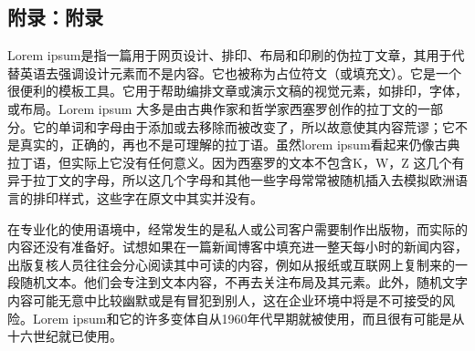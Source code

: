 \documentclass[a4paper,twoside]{article}
\begin{document}
\begin{spacing}{1.2}
\addtocounter{page}{-1}
\thispagestyle{empty}


\newpage
\appendix
\section*{附录：附录}
Lorem ipsum是指一篇用于网页设计、排印、布局和印刷的伪拉丁文章，其用于代替英语去强调设计元素而不是内容。它也被称为占位符文（或填充文）。它是一个很便利的模板工具。它用于帮助编排文章或演示文稿的视觉元素，如排印，字体，或布局。Lorem ipsum 大多是由古典作家和哲学家西塞罗创作的拉丁文的一部分。它的单词和字母由于添加或去移除而被改变了，所以故意使其内容荒谬；它不是真实的，正确的，再也不是可理解的拉丁语。虽然lorem ipsum看起来仍像古典拉丁语，但实际上它没有任何意义。因为西塞罗的文本不包含K，W，Z 这几个有异于拉丁文的字母，所以这几个字母和其他一些字母常常被随机插入去模拟欧洲语言的排印样式，这些字在原文中其实并没有。

在专业化的使用语境中，经常发生的是私人或公司客户需要制作出版物，而实际的内容还没有准备好。试想如果在一篇新闻博客中填充进一整天每小时的新闻内容，出版复核人员往往会分心阅读其中可读的内容，例如从报纸或互联网上复制来的一段随机文本。他们会专注到文本内容，不再去关注布局及其元素。此外，随机文字内容可能无意中比较幽默或是有冒犯到别人，这在企业环境中将是不可接受的风险。Lorem ipsum和它的许多变体自从1960年代早期就被使用，而且很有可能是从十六世纪就已使用。
\addtocounter{page}{-1}
\thispagestyle{empty}

\end{spacing}
\end{document}
